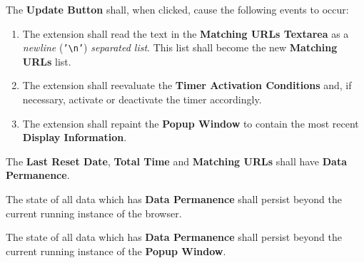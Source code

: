 \documentclass{designdoc}
\begin{document}
The \textbf{Update Button} shall, when clicked, cause the following events to
occur:
\begin{enumerate}
\item The extension shall read the text in the \textbf{Matching URLs Textarea}
  as a \textit{newline} (\texttt{'\textbackslash{}n'}) \textit{separated list}.
  This list shall become the new \textbf{Matching URLs} list.
\item The extension shall reevaluate the \textbf{Timer Activation Conditions}
  and, if necessary, activate or deactivate the timer accordingly.
\item The extension shall repaint the \textbf{Popup Window} to contain the most
  recent \textbf{Display Information}.
\end{enumerate}

The \textbf{Last Reset Date}, \textbf{Total Time} and \textbf{Matching URLs}
shall have \textbf{Data Permanence}.

The state of all data which has \textbf{Data Permanence} shall persist beyond
the current running instance of the browser.

The state of all data which has \textbf{Data Permanence} shall persist beyond
the current running instance of the \textbf{Popup Window}.
\end{document}
